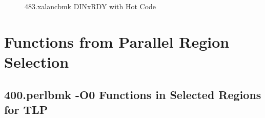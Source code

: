 \documentclass[defaultstyle,11pt]{thesis}
\begin{document}
\begin{figure}
  \centering
  \hspace{5mm}
  \caption{483.xalancbmk DINxRDY with Hot Code}
  \label{fig:483xalancbmkhot}
\end{figure}




\chapter{Functions from Parallel Region Selection}
\label{appdx:spec2006regioncode}

\section{400.perlbmk -O0 Functions in Selected Regions for TLP}
        {\small
          
        }
        
\end{document}

